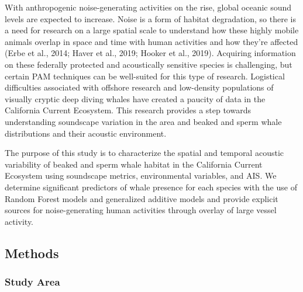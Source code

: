 \documentclass[
]{article}
\begin{document}
With anthropogenic noise-generating activities on the rise, global
oceanic sound levels are expected to increase. Noise is a form of
habitat degradation, so there is a need for research on a large spatial
scale to understand how these highly mobile animals overlap in space and
time with human activities and how they're affected (Erbe et al., 2014;
Haver et al., 2019; Hooker et al., 2019). Acquiring information on these
federally protected and acoustically sensitive species is challenging,
but certain PAM techniques can be well-suited for this type of research.
Logistical difficulties associated with offshore research and
low-density populations of visually cryptic deep diving whales have
created a paucity of data in the California Current Ecosystem. This
research provides a step towards understanding soundscape variation in
the area and beaked and sperm whale distributions and their acoustic
environment.

The purpose of this study is to characterize the spatial and temporal
acoustic variability of beaked and sperm whale habitat in the California
Current Ecosystem using soundscape metrics, environmental variables, and
AIS. We determine significant predictors of whale presence for each
species with the use of Random Forest models and generalized additive
models and provide explicit sources for noise-generating human
activities through overlay of large vessel activity.

\hypertarget{methods}{%
\subsection{Methods}\label{methods}}

\hypertarget{study-area}{%
\subsubsection{\texorpdfstring{\textbf{Study
Area}}{Study Area}}\label{study-area}}
\end{document}

